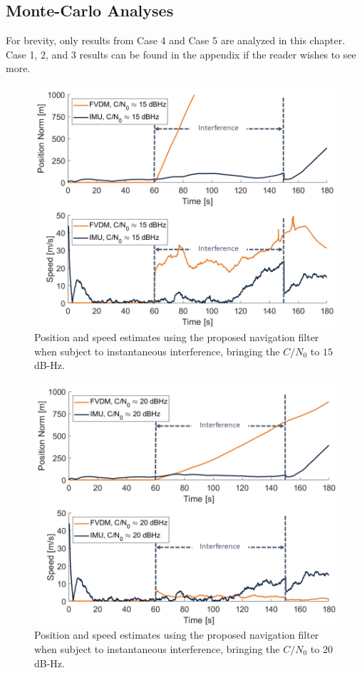 \subsection{\textbf{Monte-Carlo Analyses}}
For brevity, only results from Case 4 and Case 5 are analyzed in this chapter. Case 1, 2, and 3 results can be found in the appendix if the reader wishes to see more. 
\begin{figure}[!ht]
    \centering
    \includegraphics[width=0.75\linewidth]{Figures/Results/trajectoryfigure/Slide14.PNG}
    \caption{Position and speed estimates using the proposed navigation filter when subject to instantaneous interference, bringing the \(C/N_0\) to \(15\) dB-Hz.}\label{fig:PosVel15}
\end{figure}

\begin{figure}[!ht]
    \centering
    \includegraphics[width=0.75\linewidth]{Figures/Results/trajectoryfigure/Slide15.PNG}
    \caption{Position and speed estimates using the proposed navigation filter when subject to instantaneous interference, bringing the \(C/N_0\) to \(20\) dB-Hz.}\label{fig:PosVel20}
\end{figure}


